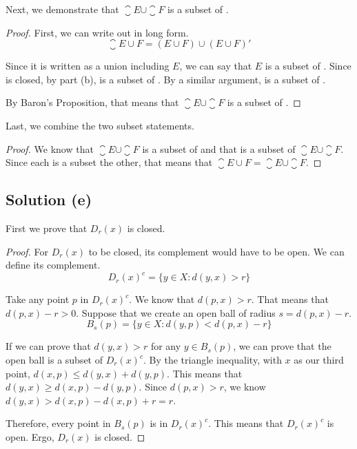 \documentclass[11pt]{article}
\begin{document}
        Next, we demonstrate that $\closure{E} \cup \closure{F}$ is a subset of .
        \begin{proof}
            First, we can write out  in long form.
            \begin{equation}
                \closure{E \cup F} = (E \cup F) \cup (E \cup F)'
            \end{equation}

            Since it is written as a union including $E$, we can say that $E$ is a subset of .
            Since  is closed, by part (b),  is a subset of .
            By a similar argument,  is a subset of .
            
            By Baron's Proposition, that means that $\closure{E} \cup \closure{F}$ is a subset of .
        \end{proof}

        Last, we combine the two subset statements.
        \begin{proof}
            We know that $\closure{E} \cup \closure{F}$ is a subset of  and that  is a subset of $\closure{E} \cup \closure{F}$.
            Since each is a subset the other, that means that $\closure{E \cup F} = \closure{E} \cup \closure{F}$.
        \end{proof}

    \subsection{Solution (e)}
        First we prove that $D_r(x)$ is closed.
        \begin{proof}
            For $D_r(x)$ to be closed, its complement would have to be open.
            We can define its complement.
            \begin{equation}
                D_r(x)^c = \{ y \in X : d(y,x) > r \}
            \end{equation}

            Take any point $p$ in $D_r(x)^c$.
            We know that $d(p,x) > r$.
            That means that $d(p,x) - r > 0$.
            Suppose that we create an open ball of radius $s = d(p,x) - r$.
            \begin{equation}
                B_s(p) = \{ y \in X : d(y,p) < d(p,x) - r\}
            \end{equation}

            If we can prove that $d(y,x) > r$ for any $y \in B_s(p)$, we can prove that the open ball is a subset of $D_r(x)^c$.
            By the triangle inequality, with $x$ as our third point, $d(x,p) \leq d(y,x) + d(y,p)$.
            This means that $d(y,x) \geq d(x,p) - d(y,p)$.
            Since $d(p,x) > r$, we know $d(y,x) > d(x,p) - d(x,p) + r = r$.

            Therefore, every point in $B_s(p)$ is in $D_r(x)^c$.
            This means that $D_r(x)^c$ is open.
            Ergo, $D_r(x)$ is closed.
        \end{proof}
\end{document}
